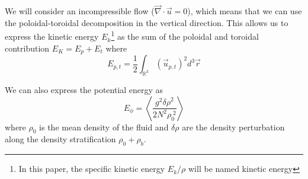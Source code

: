 \documentclass[11pt,twocolumn]{article}
\begin{document}
We will consider an incompressible flow ($\vec{\nabla} \cdot \vec{u} = 0$), which means that we can use the poloidal-toroidal decomposition \cite{schmitt_decomposition_1992} in the vertical direction. This allows us to express the kinetic energy $E_k$\footnote{In this paper, the specific kinetic energy $E_k/\rho$ will be named kinetic energy} as the sum of the poloidal and toroidal contribution $E_K = E_p + E_t$ where
\begin{equation*}
	E_{p,t} = \frac{1}{2} \int_{\mathbb{R}^3} \left( \vec{u}_{p,t} \right)^2 d^3 \vec{r}
\end{equation*}

We can also express the potential energy as
\begin{equation}
	E_\phi = \left\langle \frac{g^2 {\delta \rho}^2}{2 N^2 \rho_0^{\;2}} \right\rangle \label{eq:Potential Energy}
\end{equation}
where $\rho_0$ is the mean density of the fluid and $\delta \rho$ are the density perturbation along the density stratification $\rho_0 + \rho_b$.







\newpage

\printbibliography
\end{document}
